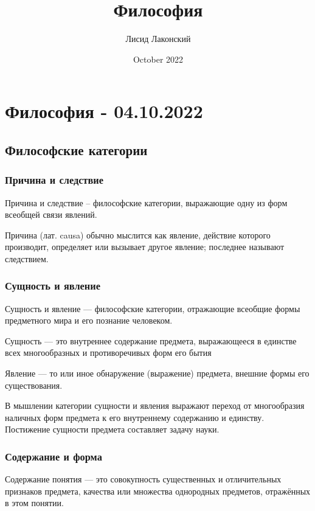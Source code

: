 \documentclass{article}
\title{Философия}
\author{Лисид Лаконский}
\date{October 2022}
\begin{document}
\maketitle
\tableofcontents
\pagebreak

\section{Философия - 04.10.2022}

\subsection{Философские категории}

\subsubsection{Причина и следствие}

Причина и следствие – философские категории, выражающие одну из форм всеобщей связи явлений.

Причина (лат. causa) обычно мыслится как явление, действие которого производит, определяет или вызывает другое явление; последнее называют следствием. 

\subsubsection{Сущность и явление}

Сущность и явление — философские категории, отражающие всеобщие формы предметного мира и его познание человеком.

Сущность — это внутреннее содержание предмета, выражающееся в единстве всех многообразных и противоречивых форм его бытия

Явление — то или иное обнаружение (выражение) предмета, внешние формы его существования.

В мышлении категории сущности и явления выражают переход от многообразия наличных форм предмета к его внутреннему содержанию и единству. Постижение сущности предмета составляет задачу науки.

\subsubsection{Содержание и форма}

Содержание понятия — это совокупность существенных и отличительных признаков предмета, качества или множества однородных предметов, отражённых в этом понятии.
\end{document}
